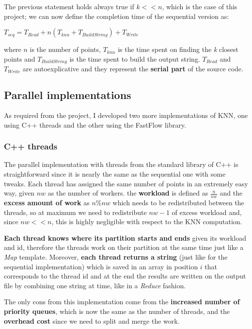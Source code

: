 The previous statement holds always true if $k<<n$, which is the case of this project; we can now define the completion time of the sequential version as:

\begin{center}
\begin{Large}
$T_{seq}=T_{Read}+n(T_{knn}+T_{BuildString})+T_{Write}$
\end{Large}
\end{center}
where $n$ is the number of points, $T_{knn}$ is the time spent on finding the \textit{k} closest points and $T_{BuildString}$ is the time spent to build the output string. $T_{Read}$ and $T_{Write}$ are autoexplicative and they represent the \textbf{serial part} of the source code.

\subsection{Parallel implementations}\label{subsec:par_implementations}
As required from the project, I developed two more implementations of KNN, one using C++ threads and the other using the FastFlow library.
\subsubsection{C++ threads}
The parallel implementation with threads from the standard library of C++ is straightforward since it is nearly the same as the sequential one with some tweaks. Each thread has assigned the same number of points in an extremely easy way, given $nw$ as the number of workers. the \textbf{workload} is defined as $\frac{n}{nw}$ and the \textbf{excess amount of work} as $n\%nw$ which needs to be redistributed between the threads, so at maximum we need to redistribute $nw-1$ of excess workload and, since $nw<<n$, this is highly negligible with respect to the KNN computation.
\vspace{3mm}

\textbf{Each thread knows where its partition starts and ends} given its workload and id, therefore the threads work on their partition at the same time just like a \textit{Map} template.
Moreover, \textbf{each thread returns a string} (just like for the sequential implementation) which is saved in an array in position $i$ that corresponds to the thread id and at the end the results are written on the output file by combining one string at time, like in a \textit{Reduce} fashion.
\vspace{3mm}

The only cons from this implementation come from the \textbf{increased number of priority queues}, which is now the same as the number of threads, and the \textbf{overhead cost} since we need to split and merge the work.

